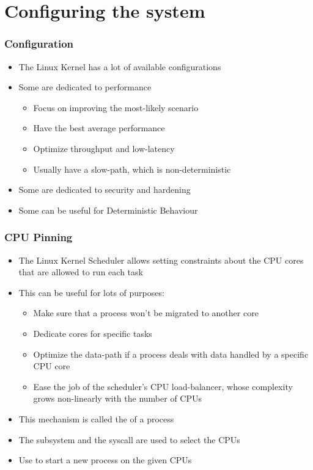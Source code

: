 \section{Configuring the system}

\begin{frame}
	\frametitle{Configuration}
	\begin{itemize}
		\item The Linux Kernel has a lot of available configurations
		\item Some are dedicated to performance
			\begin{itemize}
				\item Focus on improving the most-likely scenario
				\item Have the best average performance
				\item Optimize throughput and low-latency
				\item Usually have a slow-path, which is non-deterministic
			\end{itemize}
		\item Some are dedicated to security and hardening
		\item Some can be useful for Deterministic Behaviour
	\end{itemize}
\end{frame}

\begin{frame}
	\frametitle{CPU Pinning}
	\begin{itemize}
		\item The Linux Kernel Scheduler allows setting constraints about the CPU cores that are allowed
			to run each task
		\item This can be useful for lots of purposes:
			\begin{itemize}
				\item Make sure that a process won't be migrated to another core
				\item Dedicate cores for specific tasks
				\item Optimize the data-path if a process deals with data handled by a specific CPU core
				\item Ease the job of the scheduler's CPU load-balancer, whose complexity grows non-linearly with the number of CPUs
			\end{itemize}
		\item This mechanism is called the  of a process
		\item The  subsystem and the  syscall are used to select the CPUs
		\item Use  to start a new process on the given CPUs
	\end{itemize}
\end{frame}

